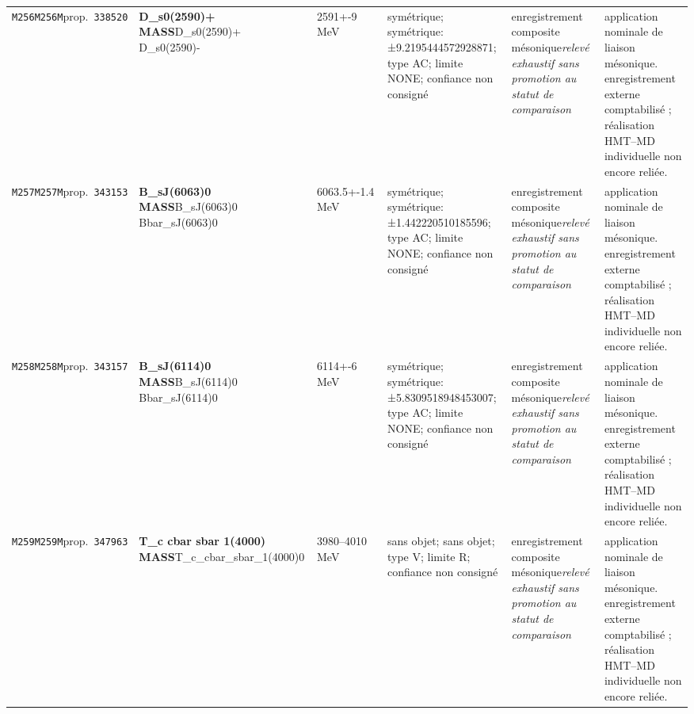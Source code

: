 \begin{landscape}
\begin{longtable}{L{1.85cm}L{4.45cm}L{2.35cm}L{4.05cm}L{3.35cm}L{7.15cm}}
\texttt{M256}\newline \texttt{M256M}\newline prop.\ \texttt{338520} & \textbf{D\_\allowbreak{}s0(2590)+ MASS}\newline D\_\allowbreak{}s0(2590)+ \textbar{}\allowbreak{} D\_\allowbreak{}s0(2590)- & 2591+-9\,MeV & symétrique; symétrique: ±9.2195444572928871; type AC; limite NONE; confiance non consigné & enregistrement composite mésonique\newline \emph{relevé exhaustif sans promotion au statut de comparaison} & application nominale de liaison mésonique. enregistrement externe comptabilisé ; réalisation HMT--MD individuelle non encore reliée. \\
\texttt{M257}\newline \texttt{M257M}\newline prop.\ \texttt{343153} & \textbf{B\_\allowbreak{}sJ(6063)0 MASS}\newline B\_\allowbreak{}sJ(6063)0 \textbar{}\allowbreak{} Bbar\_\allowbreak{}sJ(6063)0 & 6063.5+-1.4\,MeV & symétrique; symétrique: ±1.442220510185596; type AC; limite NONE; confiance non consigné & enregistrement composite mésonique\newline \emph{relevé exhaustif sans promotion au statut de comparaison} & application nominale de liaison mésonique. enregistrement externe comptabilisé ; réalisation HMT--MD individuelle non encore reliée. \\
\texttt{M258}\newline \texttt{M258M}\newline prop.\ \texttt{343157} & \textbf{B\_\allowbreak{}sJ(6114)0 MASS}\newline B\_\allowbreak{}sJ(6114)0 \textbar{}\allowbreak{} Bbar\_\allowbreak{}sJ(6114)0 & 6114+-6\,MeV & symétrique; symétrique: ±5.8309518948453007; type AC; limite NONE; confiance non consigné & enregistrement composite mésonique\newline \emph{relevé exhaustif sans promotion au statut de comparaison} & application nominale de liaison mésonique. enregistrement externe comptabilisé ; réalisation HMT--MD individuelle non encore reliée. \\
\texttt{M259}\newline \texttt{M259M}\newline prop.\ \texttt{347963} & \textbf{T\_\allowbreak{}c cbar sbar 1(4000) MASS}\newline T\_\allowbreak{}c\_\allowbreak{}cbar\_\allowbreak{}sbar\_\allowbreak{}1(4000)0 & 3980--4010\,MeV & sans objet; sans objet; type V; limite R; confiance non consigné & enregistrement composite mésonique\newline \emph{relevé exhaustif sans promotion au statut de comparaison} & application nominale de liaison mésonique. enregistrement externe comptabilisé ; réalisation HMT--MD individuelle non encore reliée. \\

\end{longtable}
\end{landscape}
